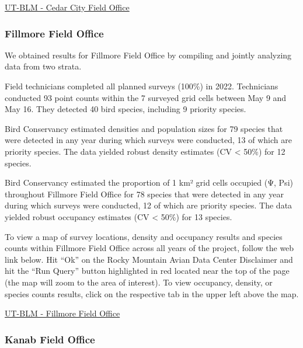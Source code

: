 \documentclass[
  letterpaper,
  DIV=11,
  numbers=noendperiod,
  oneside]{scrreprt}
\begin{document}
\href{http://www.rmbo.org/new_site/adc/QueryWindow.aspx\#N4IgzgrgDgpgTmALnAhoiBbEAuABCAVQBUBaAIQBkBZXE3AYRgBMU4GBLRAT1wDF2YAGya4A8gDNx7AMYwQAXyA=}{UT-BLM
- Cedar City Field Office}

\hypertarget{fillmore-field-office}{%
\subsubsection{Fillmore Field Office}\label{fillmore-field-office}}

We obtained results for Fillmore Field Office by compiling and jointly
analyzing data from two strata.

Field technicians completed all planned surveys (100\%) in 2022.
Technicians conducted 93 point counts within the 7 surveyed grid cells
between May 9 and May 16. They detected 40 bird species, including 9
priority species.

Bird Conservancy estimated densities and population sizes for 79 species
that were detected in any year during which surveys were conducted, 13
of which are priority species. The data yielded robust density estimates
(CV \textless{} 50\%) for 12 species.

Bird Conservancy estimated the proportion of 1 km² grid cells occupied
(Ψ, Psi) throughout Fillmore Field Office for 78 species that were
detected in any year during which surveys were conducted, 12 of which
are priority species. The data yielded robust occupancy estimates (CV
\textless{} 50\%) for 13 species.

To view a map of survey locations, density and occupancy results and
species counts within Fillmore Field Office across all years of the
project, follow the web link below. Hit ``Ok'' on the Rocky Mountain
Avian Data Center Disclaimer and hit the ``Run Query'' button
highlighted in red located near the top of the page (the map will zoom
to the area of interest). To view occupancy, density, or species counts
results, click on the respective tab in the upper left above the map.

\href{http://www.rmbo.org/new_site/adc/QueryWindow.aspx\#N4IgzgrgDgpgTmALnAhoiBbEAuABCAVQBUBaAIQBkBZXE3AMQEsAbZjAezhgcZmYBNcAeQBmIxgGMYIAL5A=}{UT-BLM
- Fillmore Field Office}

\hypertarget{kanab-field-office}{%
\subsubsection{Kanab Field Office}\label{kanab-field-office}}
\end{document}

